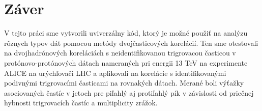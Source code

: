\documentclass[thesismargins, thesislinespacing]{rnthesis}
\begin{document}
\chapter*{Záver}
V tejto práci sme vytvorili uviverzálny kód, ktorý je možné použiť na analýzu rôznych typov dát pomocou metódy dvojčasticových korelácií. Ten sme otestovali na dvojhadrónových koreláciách s neidentifikovanou trigrovacou časticou v protónovo-pro\-tó\-no\-vých dátach nameraných pri energii 13 TeV na experimente ALICE na urýchľovači LHC a aplikovali na korelácie s identifikovanými podivnými trigrovacími časticami na rovnakých dátach. Merané boli výťažky asociovaných častíc v jetoch pre piľahlý aj protiľahlý pík v závislosti od priečnej hybnosti trigrovacích častíc a multiplicity zrážok.





%

\end{document}

